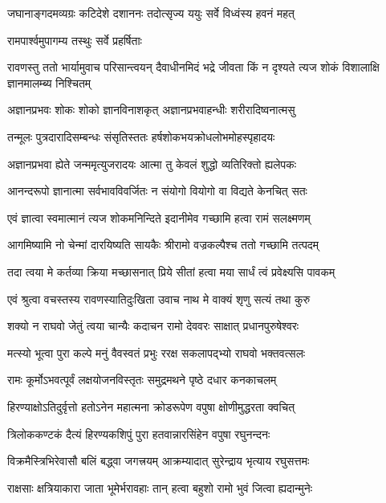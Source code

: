 \twolineshloka
{जघानाङ्गदमव्यग्रः कटिदेशे दशाननः}
{तदोत्सृज्य ययुः सर्वे विध्वंस्य हवनं महत्} %

{रामपार्श्वमुपागम्य तस्थुः सर्वे प्रहर्षिताः} %


\threelineshloka
{रावणस्तु ततो भार्यामुवाच परिसान्त्वयन्}
{दैवाधीनमिदं भद्रे जीवता किं न दृश्यते}
{त्यज शोकं विशालाक्षि ज्ञानमालम्ब्य निश्चितम्} %

\twolineshloka
{अज्ञानप्रभवः शोकः शोको ज्ञानविनाशकृत्}
{अज्ञानप्रभवाहन्धीः शरीरादिष्वनात्मसु} %

\twolineshloka
{तन्मूलः पुत्रदारादिसम्बन्धः संसृतिस्ततः}
{हर्षशोकभयक्रोधलोभमोहस्पृहादयः} %

\twolineshloka
{अज्ञानप्रभवा ह्येते जन्ममृत्युजरादयः}
{आत्मा तु केवलं शुद्धो व्यतिरिक्तो ह्यलेपकः} %

\twolineshloka
{आनन्दरूपो ज्ञानात्मा सर्वभावविवर्जितः}
{न संयोगो वियोगो वा विद्यते केनचित् सतः} %

\twolineshloka
{एवं ज्ञात्वा स्वमात्मानं त्यज शोकमनिन्दिते}
{इदानीमेव गच्छामि हत्वा रामं सलक्ष्मणम्} %

\twolineshloka
{आगमिष्यामि नो चेन्मां दारयिष्यति सायकैः}
{श्रीरामो वज्रकल्पैश्च ततो गच्छामि तत्पदम्} %

\twolineshloka
{तदा त्वया मे कर्तव्या क्रिया मच्छासनात् प्रिये}
{सीतां हत्वा मया सार्धं त्वं प्रवेक्ष्यसि पावकम्} %

\twolineshloka
{एवं श्रुत्वा वचस्तस्य रावणस्यातिदुःखिता}
{उवाच नाथ मे वाक्यं शृणु सत्यं तथा कुरु} %

\twolineshloka
{शक्यो न राघवो जेतुं त्वया चान्यैः कदाचन}
{रामो देववरः साक्षात् प्रधानपुरुषेश्वरः} %

\twolineshloka
{मत्स्यो भूत्वा पुरा कल्पे मनुं वैवस्वतं प्रभुः}
{ररक्ष सकलापद्भ्यो राघवो भक्तवत्सलः} %

\twolineshloka
{रामः कूर्मोऽभवत्पूर्वं लक्षयोजनविस्तृतः}
{समुद्रमथने पृष्ठे दधार कनकाचलम्} %

\twolineshloka
{हिरण्याक्षोऽतिदुर्वृत्तो हतोऽनेन महात्मना}
{क्रोडरूपेण वपुषा क्षोणीमुद्धरता क्वचित्} %

\twolineshloka
{त्रिलोककण्टकं दैत्यं हिरण्यकशिपुं पुरा}
{हतवान्नारसिंहेन वपुषा रघुनन्दनः} %

\twolineshloka
{विक्रमैस्त्रिभिरेवासौ बलिं बद्\mbox{}ध्वा जगत्त्रयम्}
{आक्रम्यादात् सुरेन्द्राय भृत्याय रघुसत्तमः} %

\twolineshloka
{राक्षसाः क्षत्रियाकारा जाता भूमेर्भरावहाः}
{तान् हत्वा बहुशो रामो भुवं जित्वा ह्यदान्मुनेः} %

